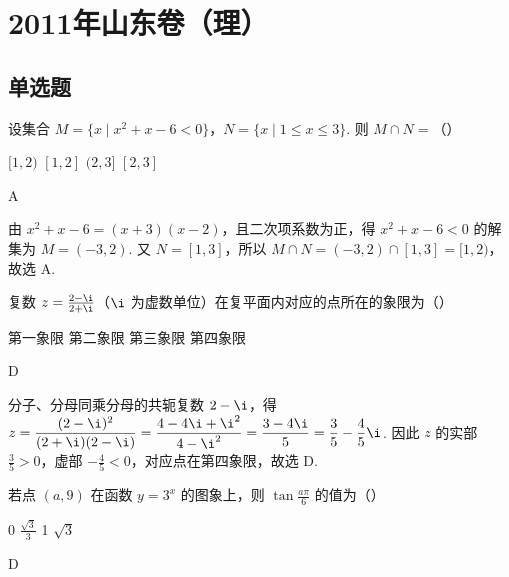 \chapter{2011年山东卷（理）}

\section{单选题}

\begin{problem}
设集合 \(M = \{x \mid x^2 + x - 6 < 0\}\)，\(N = \{x \mid 1 \leqslant x \leqslant 3\}\). 则 \(M \cap N =\)（\quad）

\choices
    {\([1, 2)\)}
    {\([1, 2]\)}
    {\((2, 3]\)}
    {\([2, 3]\)}
\end{problem}

\begin{answer}
A
\end{answer}

\begin{solution}
由 \(x^{2}+x-6=(x+3)(x-2)\)，且二次项系数为正，得
\(x^{2}+x-6<0\) 的解集为 \(M=(-3,2)\). 又 \(N=[1,3]\)，所以
\(M\cap N=(-3,2)\cap[1,3]=[1,2)\)，故选 A.
\end{solution}

\begin{problem}
复数 \(z = \frac{2 - \i}{2 + \i}\)（\(\i\) 为虚数单位）在复平面内对应的点所在的象限为（\quad）

\choices
    {第一象限}
    {第二象限}
    {第三象限}
    {第四象限}
\end{problem}

\begin{answer}
D
\end{answer}

\begin{solution}
分子、分母同乘分母的共轭复数 \(2-\i\)，得
\(z=\dfrac{(2-\i)^2}{(2+\i)(2-\i)}=\dfrac{4-4\i+\i^2}{4-\i^2}=\dfrac{3-4\i}{5}=\dfrac35-\dfrac45\i\).
因此 \(z\) 的实部 \(\frac35>0\)，虚部 \(-\frac45<0\)，对应点在第四象限，故选 D.
\end{solution}

\begin{problem}
若点 \((a,9)\) 在函数 \(y = 3^{x}\) 的图象上，则 \(\tan \frac{a\pi}{6}\) 的值为（\quad）

\choices
    {0}
    {\( \frac{\sqrt{3}}{3} \)}
    {1}
    {\(\sqrt{3}\)}
\end{problem}

\begin{answer}
D
\end{answer}

